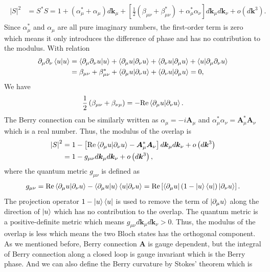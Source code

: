 \documentclass[12pt, oneside]{article}
\newcommand{\pa}{\partial}
\newcommand{\mr}[1]{\mathrm{#1}}
\newcommand{\p}[1]{\left(#1\right)}
\newcommand{\bb}[1]{\left[#1\right]}
\newcommand{\bv}[1]{\left|#1\right|}
\numberwithin{equation}{subsection}
\begin{document}
\begin{align}
	\begin{split}
		\bv{S}^2 & = S^* S = 1 + \p{\alpha^*_\mu + \alpha_\mu} d \bm{k}_\mu + \bb{\frac12 \p{\beta_{\mu \nu }+ \beta^{*}_{\mu \nu}} + \alpha^{*}_\mu \alpha_\nu} d \bm{k}_\mu d \bm{k}_\nu + o\p{d \bm{k}^3}.
	\end{split}
\end{align}
Since \(\alpha^{*}_{\mu}\) and \(\alpha_\mu\) are all pure imaginary numbers, the first-order term is zero which means it only introduces the difference of phase and has no contribution to the modulus. With relation
\begin{align}
	\begin{split}
		\pa_\mu \pa_\nu \braket{u | u} & = \braket{\pa_\mu \pa_\nu u | u} + \braket{\pa_\mu u | \pa_\nu u} + \braket{\pa_\nu u | \pa_\mu u} + \braket{u | \pa_\mu \pa_\nu u} \\
		& = \beta_{\mu \nu} + \beta^{*}_{\mu \nu} +  \braket{\pa_\mu u | \pa_\nu u} + \braket{\pa_\nu u | \pa_\mu u} = 0,
	\end{split}
\end{align}
We have
\begin{align}
	\frac12 \p{\beta_{\mu \nu} + \beta_{\nu \mu}} = - \mr{Re} \braket{\pa_\mu u | \pa_\nu u}.
\end{align}
The Berry connection can be similarly written as \(\alpha_\mu = -i \bm{A}_\mu\) and \(\alpha^{*}_{\mu} \alpha_{\nu} = \bm{A}^{*}_{\mu} \bm{A}_\nu\) which is a real number. Thus, the modulus of the overlap is
\begin{align}
	\begin{split}
		\bv{S}^2 & = 1 - \bb{\mr{Re}  \braket{\pa_\mu u | \pa_\nu u} - \bm{A}^{*}_{\mu} \bm{A}_\nu} d \bm{k}_\mu d \bm{k}_\nu + o\p{d \bm{k}^3} \\
		& = 1 - g_{\mu \nu} d \bm{k}_\mu d \bm{k}_\nu + o\p{d \bm{k}^3},
	\end{split}
\end{align}
where the quantum metric \(g_{\mu \nu}\) is defined as
\begin{align}
	\begin{split}
		g_{\mu \nu} = \mr{Re}  \braket{\pa_\mu u | \pa_\nu u} - \braket{\pa_\mu u | u} \braket{u | \pa_\nu u} = \mr{Re} \bb{\braket{\pa_\mu u | \p{1 - \ket{u} \bra{u}} | \pa_\nu u}}.
	\end{split}
\end{align}
The projection operator \(1 - \ket{u} \bra{u}\) is used to remove the term of \(\ket{\pa_{\mu} u}\) along the direction of \(\ket{u}\) which has no contribution to the overlap. The quantum metric is a positive-definite metric which means \(g_{\mu \nu} d \bm{k}_\mu d \bm{k}_\nu > 0\). Thus, the modulus of the overlap is less which means the two Bloch states has the orthogonal component. As we mentioned before, Berry connection \(\bm{A}\) is gauge dependent, but the integral of Berry connection along a closed loop is gauge invariant which is the Berry phase. And we can also define the Berry curvature by Stokes' theorem which is 
\end{document}
